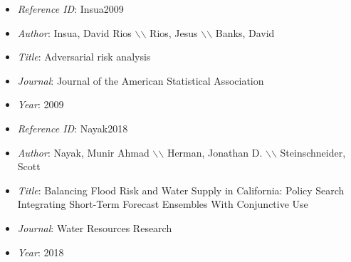 \documentclass[11pt]{article}
\begin{document}
\noindent\citep{Insua2009} 
\begin{itemize} 
\item{\textit{Reference ID}:  Insua2009} 

\item{\textit{Author}:  Insua, David Rios $\backslash$$\backslash$ Rios, Jesus $\backslash$$\backslash$ Banks, David} 

\item{\textit{Title}:  Adversarial risk analysis} 

\item{\textit{Journal}:  Journal of the American Statistical Association} 

\item{\textit{Year}:  2009} 

\end{itemize}\medskip



\noindent\citep{Nayak2018} 
\begin{itemize} 
\item{\textit{Reference ID}:  Nayak2018} 

\item{\textit{Author}:  Nayak, Munir Ahmad $\backslash$$\backslash$ Herman, Jonathan D. $\backslash$$\backslash$ Steinschneider, Scott} 

\item{\textit{Title}:  Balancing Flood Risk and Water Supply in California: Policy Search Integrating Short-Term Forecast Ensembles With Conjunctive Use} 

\item{\textit{Journal}:  Water Resources Research} 

\item{\textit{Year}:  2018} 

\end{itemize}\medskip




 
\end{document}
